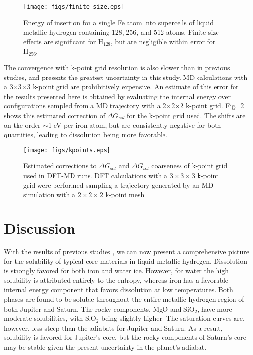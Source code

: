  \begin{figure}[h] %
   \centering
   \texttt{[image: figs/finite\_size.eps]} 
\caption{Energy of insertion for a single Fe atom into supercells of liquid metallic hydrogen containing
128, 256, and 512 atoms. Finite size effects are significant
for $\mathrm{H}_{128}$, but are negligible within error for $\mathrm{H}_{256}$. \label{fig:finite_size}}
\end{figure}

The convergence with k-point grid resolution is also slower
than in previous studies, and presents the greatest uncertainty in this study.
MD calculations with a 3$\times$3$\times$3 k-point grid are prohibitively expensive. An
estimate of this error for the results presented here is obtained by
evaluating the internal energy over configurations sampled from a MD
trajectory with a 2$\times$2$\times$2 k-point grid. Fig.~\ref{fig:kpoints} shows this
estimated correction of $\Delta G_{sol}$ for the k-point grid used. 
The shifts are on the order $\sim$1 eV per iron atom, but are
consistently negative for both quantities, leading to dissolution being more favorable. 


 \begin{figure}[h] %
   \centering
   \texttt{[image: figs/kpoints.eps]} 
\caption{Estimated corrections to $\Delta G_{sol}$ and $\Delta G_{sol}$
coarseness of k-point grid used in DFT-MD runs. DFT calculations with a $3\times
3\times 3$ k-point grid were performed sampling a trajectory generated by an MD
simulation with a $2\times2\times 2$ k-point mesh. \label{fig:kpoints}}
\end{figure}

\section{Discussion}

With the results of previous studies
\citep{Wilson2012a,wilson12b,Gonzalez2013}, we can now present a comprehensive
picture for the solubility of typical core materials in liquid
metallic hydrogen.
Dissolution is strongly favored for both iron and water
ice. However, for water the high solubility is attributed entirely to the
entropy, whereas iron has a favorable internal energy component that favors
dissolution at low temperatures.
Both phases are found to be soluble throughout the entire metallic
hydrogen region of both Jupiter and Saturn. The rocky components, MgO and
$\mathrm{SiO}_2$, have more moderate solubilities, with $\mathrm{SiO}_2$ being slightly higher. The saturation
curves are, however, less steep than the adiabats for Jupiter and Saturn. As a
result, solubility is favored for Jupiter's core, but the rocky components of
Saturn's core may be stable given the present uncertainty in the planet's
adiabat.

